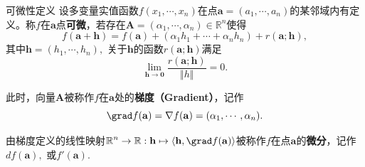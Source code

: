 \begin{frame}

\begin{block}{可微性定义}
设多变量实值函数$f(x_1,\cdots,x_n)$在点$\mathbf{a} = (a_1,\cdots,a_n)$的某邻域内有定义。称$f$在$\mathbf{a}$点{\bfseries 可微}，若存在$\mathbf{A} = (\alpha_1,\cdots,\alpha_n) \in \mathbb{R}^n$使得
\[f(\mathbf{a} + \mathbf{h}) = f(\mathbf{a}) + (\alpha_1h_1+\cdots+\alpha_nh_n) + r(\mathbf{a};\mathbf{h}),\]
其中$\mathbf{h} = (h_1,\cdots,h_n),$ 关于$\mathbf{h}$的函数$r(\mathbf{a};\mathbf{h})$满足
\[\lim\limits_{\mathbf{h}\to\mathbf{0}} \dfrac{r(\mathbf{a};\mathbf{h})}{\Vert h\Vert} = 0.\]

\pause

此时，向量$\mathbf{A}$被称作$f$在$\mathbf{a}$处的{\bfseries 梯度（Gradient）}，记作
\[\grad f(\mathbf{a}) = \nabla f(\mathbf{a}) = (\alpha_1,\cdots,\alpha_n).\]

\pause

由梯度定义的线性映射\(\displaystyle\mathbb{R}^n \to \mathbb{R}: \mathbf{h} \mapsto \langle \mathbf{h}, \grad f(\mathbf{a}) \rangle\)被称作$f$在点$\mathbf{a}$的{\bfseries 微分}，记作$df(\mathbf{a}),$ 或$f'(\mathbf{a}).$
\end{block}

\end{frame}









